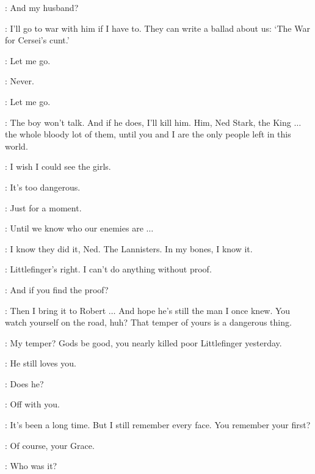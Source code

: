 \CERSEI: And my husband? 

\JAIME: I'll go to war with him if I have to. They can write a ballad about us: `The War for Cersei's cunt.' 


\CERSEI: Let me go. 

\JAIME: Never. 

\CERSEI: Let me go. 

\JAIME: The boy won't talk. And if he does, I'll kill him. Him, Ned Stark, the King $\ldots$ the whole bloody lot of them, until you and I are the only people left in this world. 

\scene



\CATELYN: I wish I could see the girls. 

\NED: It's too dangerous. 

\CATELYN: Just for a moment. 

\NED: Until we know who our enemies are $\ldots$ 

\CATELYN: I know they did it, Ned. The Lannisters. In my bones, I know it. 

\NED: Littlefinger's right. I can't do anything without proof. 

\CATELYN: And if you find the proof? 

\NED: Then I bring it to Robert $\ldots$ And hope he's still the man I once knew. You watch yourself on the road, huh? That temper of yours is a dangerous thing. 

\CATELYN: My temper? Gods be good, you nearly killed poor Littlefinger yesterday. 

\NED: He still loves you. 

\CATELYN: Does he? 

\NED: Off with you. 


\scene



\ROBERT: It's been a long time. But I still remember every face. You remember your first? 

\SELMY: Of course, your Grace. 

\ROBERT: Who was it? 

